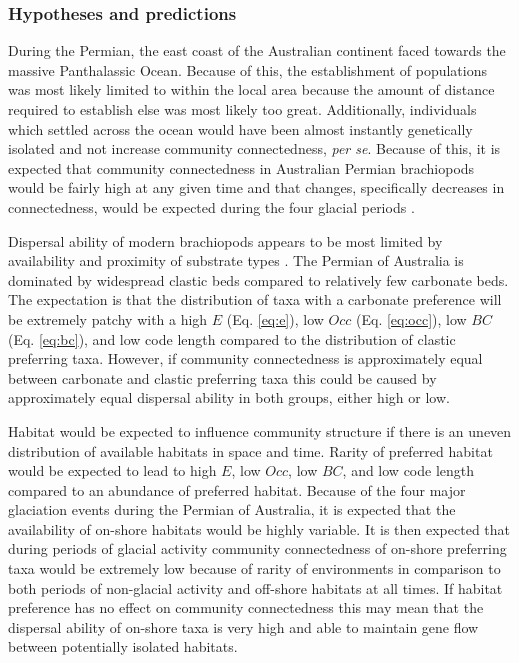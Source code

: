 \documentclass[12pt,letterpaper]{article}
\begin{document}
\subsubsection{Hypotheses and predictions} \label{sec:braccompred}
During the Permian, the east coast of the Australian continent faced towards the massive Panthalassic Ocean. Because of this, the establishment of populations was most likely limited to within the local area because the amount of distance required to establish else was most likely too great. Additionally, individuals which settled across the ocean would have been almost instantly genetically isolated and not increase community connectedness, \textit{per se}. Because of this, it is expected that community connectedness in Australian Permian brachiopods would be fairly high at any given time and that changes, specifically decreases in connectedness, would be expected during the four glacial periods \citep{Fielding2008a,Fielding2008}.

Dispersal ability of modern brachiopods appears to be most limited by availability and proximity of substrate types \citep{Richardson1997,Richardson1997a}. The Permian of Australia is dominated by widespread clastic beds compared to relatively few carbonate beds. The expectation is that the distribution of taxa with a carbonate preference will be extremely patchy with a high \(E\) (Eq. \ref{eq:e}), low \(Occ\) (Eq. \ref{eq:occ}), low \(BC\) (Eq. \ref{eq:bc}), and low code length \citep{Rosvall2008,Sidor2013} compared to the distribution of clastic preferring taxa. However, if community connectedness is approximately equal between carbonate and clastic preferring taxa this could be caused by approximately equal dispersal ability in both groups, either high or low.

Habitat would be expected to influence community structure if there is an uneven distribution of available habitats in space and time. Rarity of preferred habitat would be expected to lead to high \(E\), low \(Occ\), low \(BC\), and low code length compared to an abundance of preferred habitat. Because of the four major glaciation events during the Permian of Australia, it is expected that the availability of on-shore habitats would be highly variable. It is then expected that during periods of glacial activity community connectedness of on-shore preferring taxa would be extremely low because of rarity of environments in comparison to both periods of non-glacial activity and off-shore habitats at all times. If habitat preference has no effect on community connectedness this may mean that the dispersal ability of on-shore taxa is very high and able to maintain gene flow between potentially isolated habitats.
\end{document}
